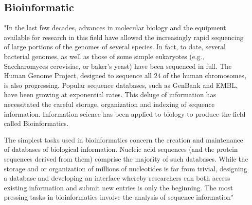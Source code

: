 \subsection{Bioinformatic}
\label{sec:bioinformatic}

"In the last few decades, advances in molecular biology and the equipment available for research in this field have allowed the increasingly rapid sequencing of large portions of the genomes of several species. In fact, to date, several bacterial genomes, as well as those of some simple eukaryotes (e.g., Saccharomyces cerevisiae, or baker's yeast) have been sequenced in full. The Human Genome Project, designed to sequence all 24 of the human chromosomes, is also progressing. Popular sequence databases, such as GenBank and EMBL, have been growing at exponential rates. This deluge of information has necessitated the careful storage, organization and indexing of sequence information. Information science has been applied to biology to produce the field called Bioinformatics.


The simplest tasks used in bioinformatics concern the creation and maintenance of databases of biological information. Nucleic acid sequences (and the protein sequences derived from them) comprise the majority of such databases. While the storage and or organization of millions of nucleotides is far from trivial, designing a database and developing an interface whereby researchers can both access existing information and submit new entries is only the beginning. The most pressing tasks in bioinformatics involve the analysis of sequence information"~\cite{Biology}


